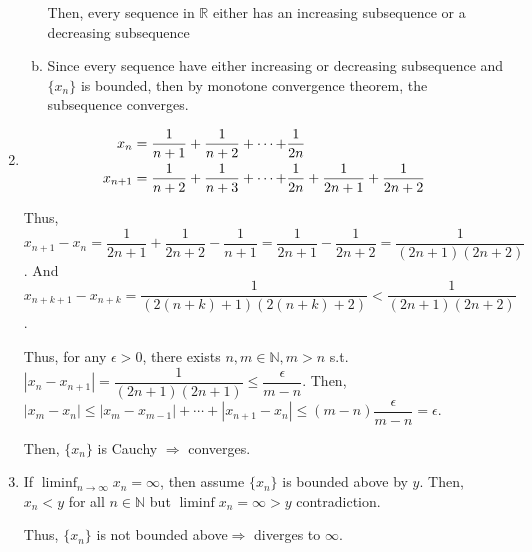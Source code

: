 \documentclass[12pt]{article}
\begin{document}
\begin{enumerate}
\begin{enumerate}[(a)]
        Then, every sequence in $\mathbb{R}$ either has an increasing subsequence or a decreasing subsequence

        \item Since every sequence have either increasing or decreasing subsequence and $\lbrace x_n \rbrace$ is bounded,
        then by monotone convergence theorem, the subsequence converges.
    \end{enumerate} 
    
    \newpage
    \item \begin{align*}
        x_n = \dfrac{1}{n+1} + \dfrac{1}{n+2} + \cdots + &\dfrac{1}{2n}
        \notag
        \\x_{n+1} = \dfrac{1}{n+2} + \dfrac{1}{n+3} + \cdots + &\dfrac{1}{2n} + \dfrac{1}{2n+1} + \dfrac{1}{2n+2}
    \end{align*}

    Thus, $x_{n+1} - x_n = \dfrac{1}{2n+1} + \dfrac{1}{2n+2} - \dfrac{1}{n+1} = \dfrac{1}{2n+1} - \dfrac{1}{2n+2} = \dfrac{1}{(2n+1)(2n+2)}$.
    And $x_{n+k+1} - x_{n+k} = \dfrac{1}{(2(n+k)+1)(2(n+k)+2)} < \dfrac{1}{(2n+1)(2n+2)}$.

    Thus, for any $\epsilon > 0$, there exists $n, m \in \mathbb{N}, m>n$ s.t. $|x_{n} - x_{n+1}| = \dfrac{1}{(2n+1)(2n+1)} \leq \dfrac{\epsilon}{m-n}$.
    Then, $|x_{m} - x_n| \leq |x_m - x_{m-1}| + \cdots + |x_{n+1} - x_n| \leq (m-n) \dfrac{\epsilon}{m-n} = \epsilon$.

    Then, $\lbrace x_n\rbrace$ is Cauchy $\Rightarrow$ converges. 

    \item If $\displaystyle\liminf_{n \to \infty} x_n = \infty$, then assume $\lbrace x_n\rbrace$ is bounded above by $y$.
    Then, $x_n < y$ for all $n \in \mathbb{N}$ but $\liminf x_n = \infty > y$ contradiction.

    Thus, $\lbrace x_n \rbrace$ is not bounded above$\Rightarrow$ diverges to $\infty$.
\end{enumerate}
\end{document}
